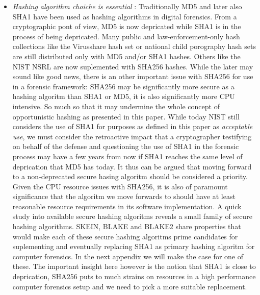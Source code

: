 \begin{itemize}
\item \emph{Hashing algorithm choiche is essential} :  Traditionally MD5 and later also SHA1 have been used as hashing algorithms in digital forensics. From a cryptographic pont of view, MD5 is now depricated while SHA1 is in the process of being depricated. Many public and law-enforcement-only hash collections like the Virusshare hash set or national child porography hash sets are still distributed only with MD5 and/or SHA1 hashes. Others like the NIST NSRL are now suplemented with SHA256 hashes. While the later may sound like good news, there is an other important issue with SHA256 for use in a forensic framework: SHA256 may be significantly more secure as a hashing algoritm than SHA1 or MD5, it is also significantly more CPU intensive. So much so that it may undermine the whole concept of opportunistic hashing as presented in this paper. While today NIST still considers the use of SHA1 for purposes as defined in this paper as \emph{acceptable use}, we must consider the retroactive impact that a cryptographer testifying on behalf of the defense and questioning the use of SHA1 in the forensic process may have a few years from now if SHA1 reaches the same level of deprication that MD5 has today. It thus can be argued that moving forward to a non-deprecated secure hasing algoritm should be considered a priority. Given the CPU resource issues with SHA256, it is also of paramount significance that the algoritm we move forwards to should have at least reasonable resource requirements in its software implementation. A quick study into available secure hashing algoritms reveals a small family of secure hashing algorithms. SKEIN, BLAKE and BLAKE2 share properties that would make each of these secure hashing algoritms prime candidates for suplementing and eventually replacing SHA1 as primary hashing algoritm for computer forensics. In the next appendix we will make the case for one of these. The important insight here however is the notion that SHA1 is close to deprication, SHA256 puts to much strains on resources in a high performance computer forensics setup and we need to pick a more suitable replacement.     
\end{itemize}
